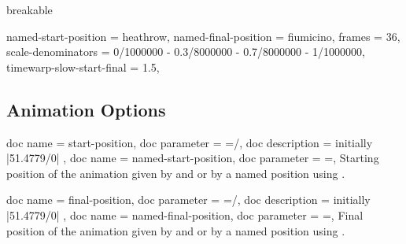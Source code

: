 \clearpage
\begin{dispExample*}{breakable}

  \begin{tcbraster}[raster height=22cm,raster columns=4,raster rows=7,
      tile,size=minimal,boxsep=1pt,colback=black!20 ]
  \begin{mrcAnimation}
    {
      named-start-position = heathrow,
      named-final-position = fiumicino,
      frames = 36,
      scale-denominators = 0/1000000 - 0.3/8000000 - 0.7/8000000 - 1/1000000,
      timewarp-slow-start-final = 1.5,
    }
    \begin{tcolorbox}
    \end{tcolorbox}
  \end{mrcAnimation}
  \end{tcbraster}
\end{dispExample*}


\clearpage
\subsection{Animation Options}\label{ref:animOptions}

\begin{docMrcKeys}[
    doc keypath = anim,
    doc new     = 2023-07-31,
  ]{
    {
      doc name        = start-position,
      doc parameter   = {=/},
      doc description = initially |51.4779/0|
    },
    {
      doc name      = named-start-position,
      doc parameter = {=},
    }
  }
  Starting position of the animation given by
   and  or by a named position using .
\end{docMrcKeys}


\begin{docMrcKeys}[
    doc keypath = anim,
    doc new     = 2023-07-31,
  ]{
    {
      doc name        = final-position,
      doc parameter   = {=/},
      doc description = initially |51.4779/0|
    },
    {
      doc name      = named-final-position,
      doc parameter = {=},
    }
  }
  Final position of the animation given by
   and  or by a named position using .
\end{docMrcKeys}



